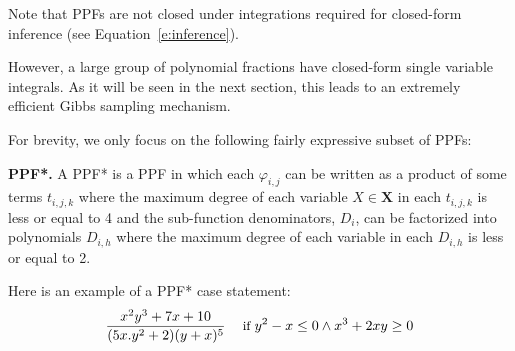 \documentclass{article}
\renewcommand{\vec}[1]{\mathbf{#1}}
\newcommand{\bvec}[1]{\textbf{#1}}
\newcommand{\singlecase}[2]{#2 \quad \text{ if } #1}
\begin{document}
Note that PPFs are not closed under integrations
required for closed-form inference (see Equation~\ref{e:inference}).

However, 
a large group of polynomial fractions have closed-form single variable integrals.
As it will be seen in the next section,
this leads to an extremely efficient Gibbs sampling mechanism.   

For brevity, we only focus on the following fairly expressive  subset of PPFs:

\textbf{PPF*. }
A PPF* is a PPF in which %
each $\varphi_{i,j}$
can be written as a product of some terms $t_{i,j,k}$ where the maximum degree of each variable $X \in \bvec{X}$ in each $t_{i,j,k}$ is less or equal to 4 %
and the sub-function denominators, $D_{i}$, can be factorized into polynomials ${D}_{i,h}$ where the maximum degree of each variable in each $D_{i,h}$ is less or equal to 2.%

Here is an example of a PPF* case statement:
\begin{equation*}
{\footnotesize
\singlecase{y^2-x\leq 0 \wedge x^3+2xy \geq 0}{\frac{x^2 y^3 + 7x + 10}{(5x.y^2 + 2)(y + x)^5}}
}
\end{equation*}

\end{document}

